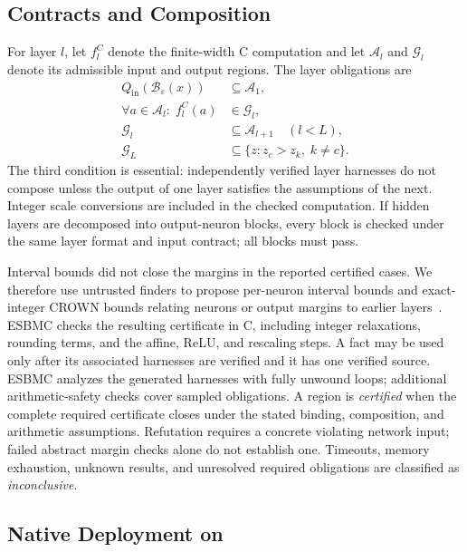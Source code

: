 \subsection{Contracts and Composition}
For layer $l$, let $f_l^C$ denote the finite-width C computation and let $\mathcal{A}_l$ and $\mathcal{G}_l$ denote its admissible input and output regions. The layer obligations are
\begin{align}
Q_{\mathrm{in}}(\mathcal{B}_{\varepsilon}(x))&\subseteq\mathcal{A}_1, \\
\forall a\in\mathcal{A}_l:\; f_l^C(a)&\in\mathcal{G}_l, \\
\mathcal{G}_l&\subseteq\mathcal{A}_{l+1}\quad(l<L), \\
\mathcal{G}_L&\subseteq\{z:z_c>z_k,\;k\neq c\}.
\label{eq:contracts}
\end{align}
The third condition is essential: independently verified layer harnesses do not compose unless the output of one layer satisfies the assumptions of the next. Integer scale conversions are included in the checked computation. If hidden layers are decomposed into output-neuron blocks, every block is checked under the same layer format and input contract; all blocks must pass.

Interval bounds did not close the margins in the reported certified cases. We therefore use untrusted finders to propose per-neuron interval bounds and exact-integer CROWN bounds relating neurons or output margins to earlier layers~\cite{3327345.3327402}. ESBMC checks the resulting certificate in C, including integer relaxations, rounding terms, and the affine, ReLU, and rescaling steps. A fact may be used only after its associated harnesses are verified and it has one verified source. ESBMC analyzes the generated harnesses with fully unwound loops; additional arithmetic-safety checks cover sampled obligations. A region is \emph{certified} when the complete required certificate closes under the stated binding, composition, and arithmetic assumptions. Refutation requires a concrete violating network input; failed abstract margin checks alone do not establish one. Timeouts, memory exhaustion, unknown results, and unresolved required obligations are classified as \emph{inconclusive}.



\subsection{Native Deployment on \AAOS{}}
\label{sec:aaos}

